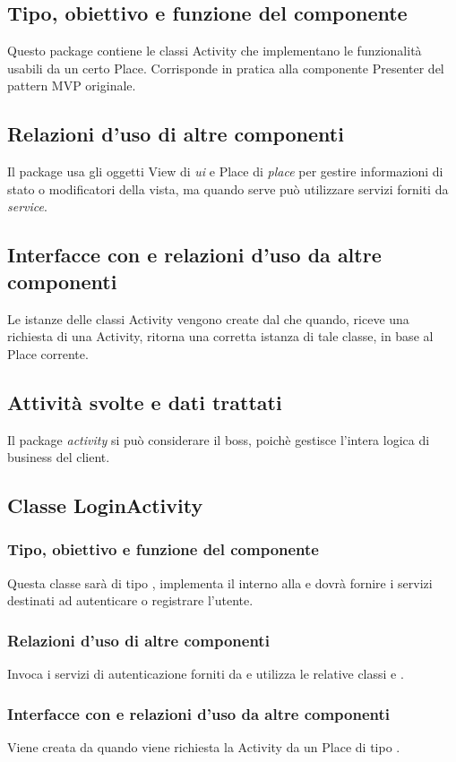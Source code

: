\subsection*{Tipo, obiettivo e funzione del componente}
Questo package contiene le classi Activity che implementano le funzionalit\`a
usabili da un certo Place. Corrisponde in pratica alla componente Presenter del
pattern MVP originale.
\subsection*{Relazioni d'uso di altre componenti}
Il package usa gli oggetti View di \emph{ui} e Place di \emph{place} per gestire
informazioni di stato o modificatori della vista, ma quando serve pu\`o
utilizzare servizi forniti da \emph{service}.
\subsection*{Interfacce con e relazioni d'uso da altre componenti} 
Le istanze delle classi Activity vengono create dal 
che quando, riceve una richiesta di una Activity, ritorna una corretta istanza
di tale classe, in base al Place corrente.
\subsection*{Attivit\`a svolte e dati trattati}
Il package \emph{activity} si pu\`o considerare il boss, poich\`e gestisce
l'intera logica di business del client.

\subsection{Classe LoginActivity}
\subsubsection*{Tipo, obiettivo e funzione del componente}
Questa classe sar\`a di tipo , implementa il 
interno alla  e dovr\`a fornire i servizi destinati ad autenticare
o registrare l'utente.
\subsubsection*{Relazioni d'uso di altre componenti}
Invoca i servizi di autenticazione forniti da  e utilizza
le relative classi  e .
\subsubsection*{Interfacce con e relazioni d'uso da altre componenti} 
Viene creata da  quando viene richiesta la Activity da
un Place di tipo .

